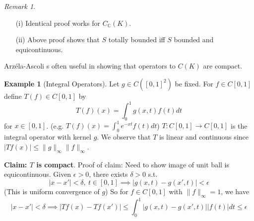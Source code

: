 \documentclass{article}
\theoremstyle{definition}
\newtheorem{example}[defn]{Example}
\theoremstyle{remark}
\newtheorem{rem}{Remark}
\theoremstyle{plain}
\newcommand{\CC}{\mathbb{C}}
\begin{document}
\begin{rem}
    \begin{itemize}
        \item[(i)] Identical proof works for $C_\CC(K)$.
        \item[(ii)] Above proof shows that $S$ totally bounded iff $S$ bounded and equicontinuous.
    \end{itemize}
\end{rem}
Arz\'ela-Ascoli s often useful in showing that operators to $C(K)$ are compact.
\begin{example}[Integral Operators]
    Let $g\in C([0,1]^2)$ be fixed. For $f\in C[0,1]$ define $T(f)\in C[0,1]$ by
    \[T(f)(x)=\int_0^1g(x,t)f(t)dt\]
    for $x\in[0,1]$. (e.g. $T(f)(x)=\int_0^1e^{-xt}f(t)dt$)
    $T:C[0,1]\to C[0,1]$ is the integral operator with kernel $g$. We observe that $T$ is linear and continuous since $|Tf(x)|\le\|g\|_\infty\|f\|_\infty$.

    \textbf{Claim: $T$ is compact}.
    Proof of claim: Need to show image of unit ball is equicontinuous. Given $\epsilon>0$, there exists $\delta>0$ s.t. 
    \[|x-x'|<\delta,\ t\in[0,1]\implies |g(x,t)-g(x',t)|<\epsilon\]
    (This is uniform convergence of $g$)
    So for $f\in C[0,1]$ with $\|f\|_\infty=1$, we have
    \[|x-x'|<\delta\implies |Tf(x)-Tf(x')|\le\int_0^1|g(x,t)-g(x',t)||f(t)|dt\le\epsilon\]
\end{example}
\end{document}
